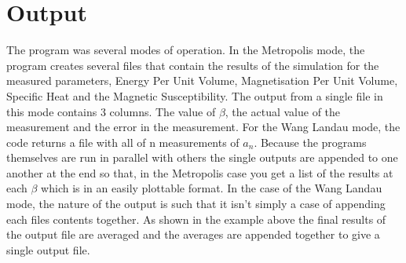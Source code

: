\section{Output}
The program was several modes of operation. In the Metropolis mode, the program creates several files that contain the results of the simulation for the measured parameters, Energy Per Unit Volume, Magnetisation Per Unit Volume, Specific Heat and the Magnetic Susceptibility.
The output from a single file in this mode contains 3 columns. The value of $\beta$, the actual value of the measurement and the error in the measurement.
For the Wang Landau mode, the code returns a file with all of n measurements of $a_n$.
Because the programs themselves are run in parallel with others the single outputs are appended to one another at the end so that, in the Metropolis case you get a list of the results at each $\beta$ which is in an easily plottable format.
In the case of the Wang Landau mode, the nature of the output is such that it isn't simply a case of appending each files contents together.
As shown in the example above the final results of the output file are averaged and the averages are appended together to give a single output file.
